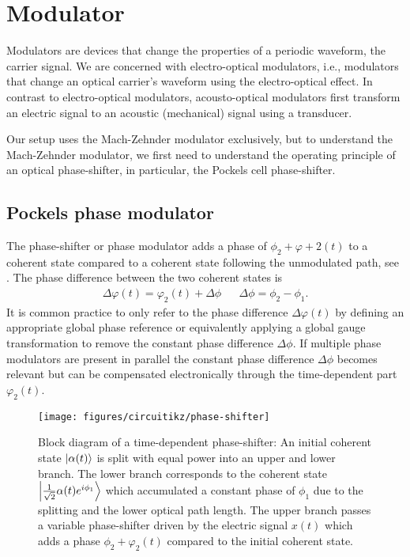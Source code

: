 \FloatBarrier
\section{Modulator}

Modulators are devices that change the properties of a periodic waveform, the carrier signal.
We are concerned with electro-optical modulators, i.e., modulators that change an optical carrier's waveform using the electro-optical effect.
In contrast to electro-optical modulators, acousto-optical modulators first transform an electric signal to an acoustic (mechanical) signal using a transducer.

Our setup uses the Mach-Zehnder modulator exclusively, but to understand the Mach-Zehnder modulator, we first need to understand the operating principle of an optical phase-shifter, in particular, the Pockels cell phase-shifter.

\FloatBarrier
\subsection{Pockels phase modulator}

The phase-shifter or phase modulator adds a phase of $\phi_2+\varphi+2(t)$ to a coherent state compared to a coherent state following the unmodulated path, see .
The phase difference between the two coherent states is
\begin{align}
	\Delta\varphi(t)
	=
	\varphi_2(t)
	+
	\Delta\phi
	&&
	\Delta\phi
	=
	\phi_2
	-
	\phi_1
	.
\end{align}
It is common practice to only refer to the phase difference $\Delta\varphi(t)$ by defining an appropriate global phase reference or equivalently applying a global gauge transformation to remove the constant phase difference $\Delta\phi$.
If multiple phase modulators are present in parallel the constant phase difference $\Delta\phi$ becomes relevant but can be compensated electronically through the time-dependent part $\varphi_2(t)$.
\begin{figure}[htb]
    \centering
    \texttt{[image: figures/circuitikz/phase-shifter]}
    \caption{Block diagram of a time-dependent phase-shifter: An initial coherent state $\ket{\alpha(t)}$ is split with equal power into an upper and lower branch. The lower branch corresponds to the coherent state $\ket{\frac{1}{\sqrt{2}}\alpha(t)e^{i\phi_1}}$ which accumulated a constant phase of $\phi_1$ due to the splitting and the lower optical path length. The upper branch passes a variable phase-shifter driven by the electric signal $x(t)$ which adds a phase $\phi_2+\varphi_2(t)$ compared to the initial coherent state.}\label{fig:phase_shifter}
\end{figure}

